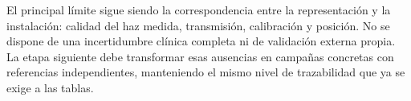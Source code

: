 El principal límite sigue siendo la correspondencia entre la representación y la instalación: calidad del haz medida, transmisión, calibración y posición. No se dispone de una incertidumbre clínica completa ni de validación externa propia. La etapa siguiente debe transformar esas ausencias en campañas concretas con referencias independientes, manteniendo el mismo nivel de trazabilidad que ya se exige a las tablas.

